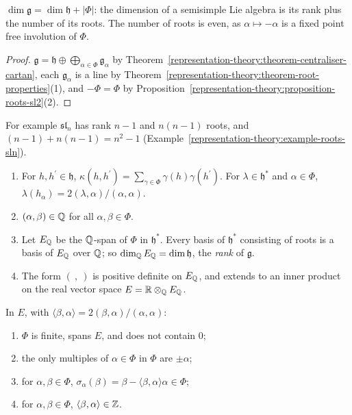 \begin{corollary}\label{representation-theory:corollary-dimension}
$\dim\mathfrak{g} = \dim\mathfrak{h} + |\Phi|$: the dimension of a semisimple Lie algebra is its rank plus the number of its roots. The number of roots is even, as $\alpha \mapsto -\alpha$ is a
fixed point free involution of $\Phi$.
\end{corollary}

\begin{proof}
$\mathfrak{g} = \mathfrak{h} \oplus \bigoplus_{\alpha \in \Phi}\mathfrak{g}_\alpha$ by Theorem~\ref{representation-theory:theorem-centraliser-cartan}, each $\mathfrak{g}_\alpha$ is a line by
Theorem~\ref{representation-theory:theorem-root-properties}(1), and $-\Phi = \Phi$ by Proposition~\ref{representation-theory:proposition-roots-sl2}(2).
\end{proof}

For example $\mathfrak{sl}_n$ has rank $n - 1$ and $n(n - 1)$ roots, and $(n - 1) + n(n - 1) = n^2 - 1$ (Example~\ref{representation-theory:example-roots-sln}).

\begin{theorem}\label{representation-theory:theorem-root-system-of-g}
\begin{enumerate}
\item For $h, h^{\prime} \in \mathfrak{h}$, $\kappa(h, h^{\prime}) = \sum_{\gamma \in \Phi}\gamma(h)\gamma(h^{\prime})$. For $\lambda \in \mathfrak{h}^*$ and $\alpha \in \Phi$,
$\lambda(h_\alpha) = 2(\lambda, \alpha)/(\alpha, \alpha)$.
\item $(\alpha, \beta) \in \mathbb{Q}$ for all $\alpha, \beta \in \Phi$.
\item Let $E_{\mathbb{Q}}$ be the $\mathbb{Q}$-span of $\Phi$ in $\mathfrak{h}^*$. Every basis of $\mathfrak{h}^*$ consisting of roots is a basis of $E_{\mathbb{Q}}$ over $\mathbb{Q}$; so
$\dim_{\mathbb{Q}} E_{\mathbb{Q}} = \dim\mathfrak{h}$, the \emph{rank} of $\mathfrak{g}$.
\item The form $(\ ,\ )$ is positive definite on $E_{\mathbb{Q}}$, and extends to an inner product on the real vector space $E = \mathbb{R} \otimes_{\mathbb{Q}} E_{\mathbb{Q}}$.
\end{enumerate}
In $E$, with $\langle\beta, \alpha\rangle = 2(\beta, \alpha)/(\alpha, \alpha)$:
\begin{enumerate}
\item[(R1)] $\Phi$ is finite, spans $E$, and does not contain $0$;
\item[(R2)] the only multiples of $\alpha \in \Phi$ in $\Phi$ are $\pm\alpha$;
\item[(R3)] for $\alpha, \beta \in \Phi$, $\sigma_\alpha(\beta) = \beta - \langle\beta, \alpha\rangle\alpha \in \Phi$;
\item[(R4)] for $\alpha, \beta \in \Phi$, $\langle\beta, \alpha\rangle \in \mathbb{Z}$.
\end{enumerate}
\end{theorem}

